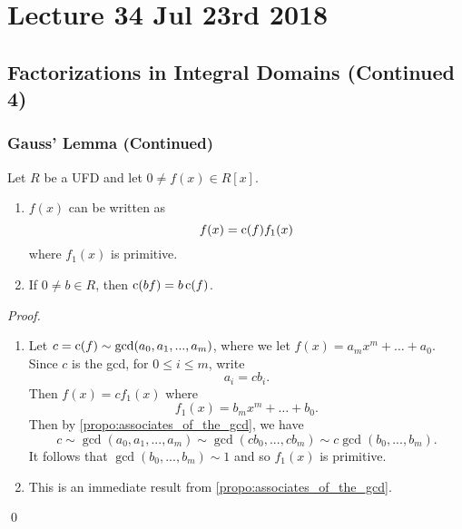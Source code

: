 \chapter{Lecture 34 Jul 23rd 2018}%
\label{chp:lecture_34_jul_23rd_2018}

\section{Factorizations in Integral Domains (Continued 4)}%
\label{sec:factorizations_in_integral_domains_continued_4}

\subsection{Gauss' Lemma (Continued)}%
\label{sub:gauss_lemma_continued}

\begin{lemma}
\label{lemma:role_of_the_content}
  Let $R$ be a UFD and let $0 \neq f(x) \in R[x]$.
  \begin{enumerate}
    \item $f(x)$ can be written as
      \begin{equation*}
        f(x) = \operatorname{c}(f) f_1(x)
      \end{equation*}
      where $f_1(x)$ is primitive.
    \item If $0 \neq b \in R$, then $\operatorname{c}(bf) = b\operatorname{c}(f)$.
  \end{enumerate}
\end{lemma}

\begin{proof}
  \begin{enumerate}
    \item Let $c = \operatorname{c}(f) \sim \gcd(a_0, a_1, ..., a_m)$, where we let $f(x) = a_m x^m + \hdots + a_0$. Since $c$ is the gcd, for $0 \leq i \leq m$, write
      \begin{equation*}
        a_i = cb_i.
      \end{equation*}
      Then $f(x) = c f_1(x)$ where
      \begin{equation*}
        f_1(x) = b_m x^m + \hdots + b_0.
      \end{equation*}
      Then by \cref{propo:associates_of_the_gcd}, we have
      \begin{equation*}
        c \sim \gcd(a_0, a_1, ..., a_m) \sim \gcd(cb_0, ..., cb_m) \sim c \gcd(b_0, ..., b_m).
      \end{equation*}
      It follows that $\gcd(b_0, ..., b_m) \sim 1$ and so $f_1(x)$ is primitive.
    \item This is an immediate result from \cref{propo:associates_of_the_gcd}.
  \end{enumerate}\qed
\end{proof}

